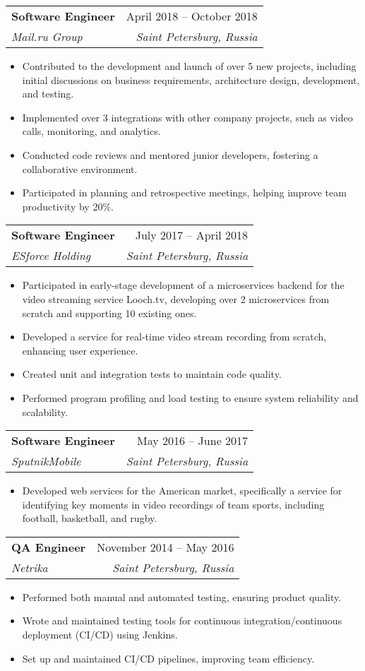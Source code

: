 \documentclass[letterpaper,11pt]{article}
\makeatletter
\newcommand{\resumeItem}[1]{
  \item\small{
    {#1 \vspace{-2pt}}
  }
}
\newcommand{\resumeSubheading}[4]{
  \vspace{-2pt}\item
    \begin{tabular*}{0.97\textwidth}[t]{l@{\extracolsep{\fill}}r}
      \textbf{#1} & #2 \\
      \textit{\small#3} & \textit{\small #4} \\
    \end{tabular*}\vspace{-7pt}
}
\newcommand{\resumeItemListStart}{\begin{itemize}}
\newcommand{\resumeItemListEnd}{\end{itemize}\vspace{-5pt}}
\makeatother
\begin{document}
  \resumeSubheading
      {Software Engineer}{April 2018 -- October 2018}
      {Mail.ru Group}{Saint Petersburg, Russia}
      \resumeItemListStart
        \resumeItem{Contributed to the development and launch of over 5 new projects, including initial discussions on business requirements, architecture design, development, and testing.}
        \resumeItem{Implemented over 3 integrations with other company projects, such as video calls, monitoring, and analytics.}
        \resumeItem{Conducted code reviews and mentored junior developers, fostering a collaborative environment.}
        \resumeItem{Participated in planning and retrospective meetings, helping improve team productivity by 20\%.}
      \resumeItemListEnd

  \resumeSubheading
      {Software Engineer}{July 2017 -- April 2018}
      {ESforce Holding}{Saint Petersburg, Russia}
      \resumeItemListStart
        \resumeItem{Participated in early-stage development of a microservices backend for the video streaming service Looch.tv, developing over 2 microservices from scratch and supporting 10 existing ones.}
        \resumeItem{Developed a service for real-time video stream recording from scratch, enhancing user experience.}
        \resumeItem{Created unit and integration tests to maintain code quality.}
        \resumeItem{Performed program profiling and load testing to ensure system reliability and scalability.}
      \resumeItemListEnd

  \resumeSubheading
      {Software Engineer}{May 2016 -- June 2017}
      {SputnikMobile}{Saint Petersburg, Russia}
      \resumeItemListStart
        \resumeItem{Developed web services for the American market, specifically a service for identifying key moments in video recordings of team sports, including football, basketball, and rugby.}
      \resumeItemListEnd

  \resumeSubheading
      {QA Engineer}{November 2014 -- May 2016}
      {Netrika}{Saint Petersburg, Russia}
      \resumeItemListStart
        \resumeItem{Performed both manual and automated testing, ensuring product quality.}
        \resumeItem{Wrote and maintained testing tools for continuous integration/continuous deployment (CI/CD) using Jenkins.}
        \resumeItem{Set up and maintained CI/CD pipelines, improving team efficiency.}
      \resumeItemListEnd

\end{document}
